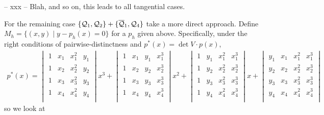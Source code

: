 \documentclass[english,11pt,a4paper]{article}
\begin{document}
-- xxx -- Blah, and so on, this leads to all tangential cases.

For the remaining case $\{ \mathcal{Q}_1, \mathcal{Q}_2\} + \{\overline {\mathcal{Q}}_1, \mathcal{Q}_4 \}$ take a more direct approach. Define $M_h = \{ (x,y) \mid y - p_h(x) = 0 \}$ for a $p_h$ given above. Specifically, under the right conditions of pairwise-distinctness and $p^*(x) = \det V \cdot p(x)$,
\begin{align*}
  p^*(x)=
  \begin{vmatrix}
  1 & x_1 & x_1^2 & y_1\\
  1 & x_2 & x_2^2 & y_2\\
  1 & x_3 & x_3^2 & y_3\\
  1 & x_4 & x_4^2 & y_4\\
  \end{vmatrix}
  x^3 +
  \begin{vmatrix}
  1 & x_1 & y_1 & x_1^3\\
  1 & x_2 & y_2 & x_2^3\\
  1 & x_3 & y_3 & x_3^3\\
  1 & x_4 & y_4 & x_4^3\\
  \end{vmatrix}
  x^2 +
  \begin{vmatrix}
  1 & y_1 & x_1^2 & x_1^3\\
  1 & y_2 & x_2^2 & x_2^3\\
  1 & y_3 & x_3^2 & x_3^3\\
  1 & y_4 & x_4^2 & x_4^3\\
  \end{vmatrix}
  x +
  \begin{vmatrix}
  y_1 & x_1 & x_1^2 & x_1^3\\
  y_2 & x_2 & x_2^2 & x_2^3\\
  y_3 & x_3 & x_3^2 & x_3^3\\
  y_4 & x_4 & x_4^2 & x_4^3\\
  \end{vmatrix}
\end{align*}
so we look at
\end{document}
